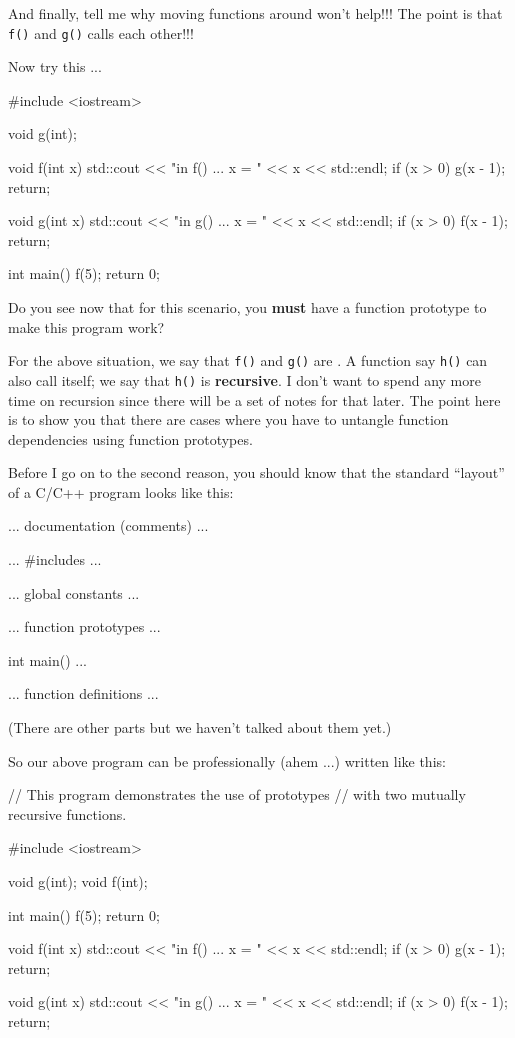 And finally, tell me why moving functions around won't help!!! The point is
that \texttt{f()} and \texttt{g()} calls each other!!!

Now try this ...

\begin{consolethree}[escapeinside=||]
#include <iostream>

void g(int);

void f(int x)
{
    std::cout << "in f() ... x = " << x << std::endl;
    if (x > 0) g(x - 1);
    return;
}

void g(int x)
{
    std::cout << "in g() ... x = " << x << std::endl;
    if (x > 0) f(x - 1);
    return;
}

int main()
{
    f(5);
    return 0;
}
\end{consolethree}

Do you see now that for this scenario, you \textbf{must} have a function
prototype to make this program work?

For the above situation, we say that \texttt{f()} and \texttt{g()} are . A function say \texttt{h()} can also call itself; we say that \texttt{h()} is \textbf{recursive}. I don't want to spend any more time on recursion since there will be a set of notes for that later. The point here is to show you that there are cases where you have to untangle function dependencies using function prototypes.

Before I go on to the second reason, you should know that the standard ``layout'' of a C/C++ program looks like this:

\begin{consolethree}[escapeinside=||]
... documentation (comments) ...

... #includes ...

... global constants ...

... function prototypes ...

int main()
{
    ...
}

... function definitions ...
\end{consolethree}

(There are other parts but we haven't talked about them yet.)

So our above program can be professionally (ahem ...) written like this:

\begin{consolethree}[escapeinside=||]
// This program demonstrates the use of prototypes
// with two mutually recursive functions.

#include <iostream>

void g(int);
void f(int);

int main()
{
    f(5);
    return 0;
}

void f(int x)
{
    std::cout << "in f() ... x = " << x << std::endl;
    if (x > 0) g(x - 1);
    return;
}

void g(int x)
{
    std::cout << "in g() ... x = " << x << std::endl;
    if (x > 0) f(x - 1);
    return;
}
\end{consolethree}


